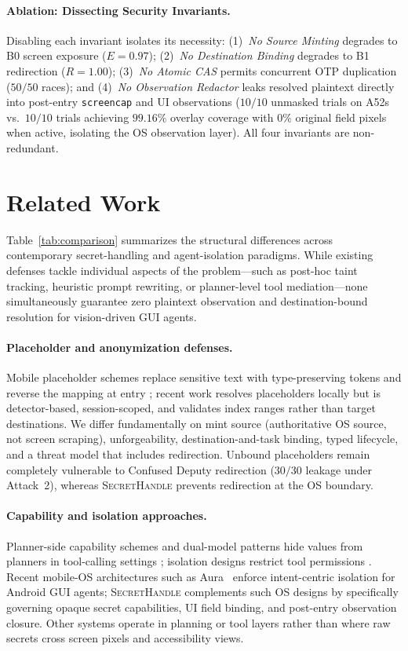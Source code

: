 \documentclass[sigconf,10pt]{acmart}
\newcommand{\SH}{\textsc{SecretHandle}}
\theoremstyle{acmplain}%
\begin{document}
\paragraph{Ablation: Dissecting Security Invariants.}
Disabling each invariant isolates its necessity: (1)~\emph{No Source Minting} degrades to B0 screen exposure ($E=0.97$); (2)~\emph{No Destination Binding} degrades to B1 redirection ($R=1.00$); (3)~\emph{No Atomic CAS} permits concurrent OTP duplication ($50/50$ races); and (4)~\emph{No Observation Redactor} leaks resolved plaintext directly into post-entry \texttt{screencap} and UI observations ($10/10$ unmasked trials on A52s vs.\ $10/10$ trials achieving $99.16\%$ overlay coverage with $0\%$ original field pixels when active, isolating the OS observation layer). All four invariants are non-redundant.
\section{Related Work}
\label{sec:related}

Table~\ref{tab:comparison} summarizes the structural differences across contemporary secret-handling and agent-isolation paradigms. While existing defenses tackle individual aspects of the problem---such as post-hoc taint tracking, heuristic prompt rewriting, or planner-level tool mediation---none simultaneously guarantee zero plaintext observation and destination-bound resolution for vision-driven GUI agents.

\paragraph{Placeholder and anonymization defenses.} Mobile placeholder schemes replace sensitive text with type-preserving tokens and reverse the mapping at entry \cite{zhao2026anonymization}; recent work resolves placeholders locally but is detector-based, session-scoped, and validates index ranges rather than target destinations. We differ fundamentally on mint source (authoritative OS source, not screen scraping), unforgeability, destination-and-task binding, typed lifecycle, and a threat model that includes redirection. Unbound placeholders remain completely vulnerable to Confused Deputy redirection ($30/30$ leakage under Attack~2), whereas \SH{} prevents redirection at the OS boundary.

\paragraph{Capability and isolation approaches.} Planner-side capability schemes and dual-model patterns hide values from planners in tool-calling settings \cite{debenedetti2025camel,costa2025fides}; isolation designs restrict tool permissions \cite{bagdasarian2024airgap,wu2025isolategpt,shi2025progent}. Recent mobile-OS architectures such as Aura~\cite{zou2026aura} enforce intent-centric isolation for Android GUI agents; \SH{} complements such OS designs by specifically governing opaque secret capabilities, UI field binding, and post-entry observation closure. Other systems operate in planning or tool layers rather than where raw secrets cross screen pixels and accessibility views.
\end{document}
